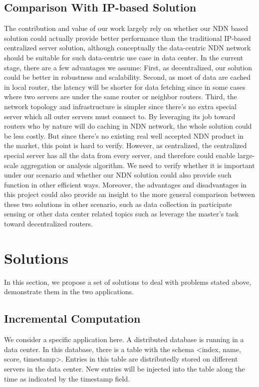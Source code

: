 \documentclass[journal]{IEEEtran}
\begin{document}
\subsection{Comparison With IP-based Solution}
The contribution and value of our work largely rely on whether our NDN based
solution could actually provide better performance than the traditional IP-based
centralized server solution, although conceptually the data-centric NDN network
should be suitable for such data-centric use case in data center. In the current
stage, there are a few advantages we assume: First, as decentralized, our
solution could be better in robustness and scalability. Second, as most of data
are cached in local router, the latency will be shorter for data fetching since
in some cases where two servers are under the same router or neighbor
routers. Third, the network topology and infrastructure is simpler since there’s
no extra special server which all outer servers must connect to. By leveraging
its job toward routers who by nature will do caching in NDN network, the whole
solution could be less costly. But since there’s no existing real well accepted
NDN product in the market, this point is hard to verify.  However, as
centralized, the centralized special server has all the data from every server,
and therefore could enable large-scale aggregation or analysis algorithm. We
need to verify whether it is important under our scenario and whether our NDN
solution could also provide such function in other efficient ways.  Moreover,
the advantages and disadvantages in this project could also provide an insight
to the more general comparison between these two solutions in other scenario,
such as data collection in participate sensing or other data center related
topics such as leverage the master’s task toward decentralized routers.

\section{Solutions}
In this section, we propose a set of solutions to deal with problems stated
above, demonstrate them in the two applications.
\subsection{Incremental Computation}
We consider a specific application here.  A distributed database is running in a
data center.  In this database, there is a table with the schema <{\sc index,
  name, score, timestamp}>.  Entries in this table are distributedly stored on
different servers in the data center.  New entries will be injected into the
table along the time as indicated by the {\sc timestamp} field.
\end{document}
